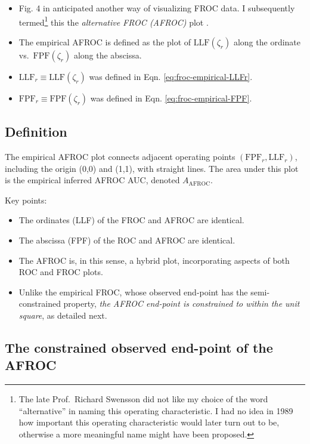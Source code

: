 \documentclass[
]{book}
\providecommand{\tightlist}{%
  \setlength{\itemsep}{0pt}\setlength{\parskip}{0pt}}
\begin{document}
\begin{itemize}
\tightlist
\item
  Fig. 4 in \citep{bunch1977free} anticipated another way of visualizing FROC data. I subsequently termed\footnote{The late Prof.~Richard Swensson did not like my choice of the word ``alternative'' in naming this operating characteristic. I had no idea in 1989 how important this operating characteristic would later turn out to be, otherwise a more meaningful name might have been proposed.} this the \emph{alternative FROC (AFROC)} plot \citep{chakraborty1989maximum}.
\item
  The empirical AFROC is defined as the plot of \(\text{LLF}(\zeta_r)\) along the ordinate vs.~\(\text{FPF}(\zeta_r)\) along the abscissa.
\item
  \(\text{LLF}_r \equiv \text{LLF}(\zeta_r)\) was defined in Eqn. \eqref{eq:froc-empirical-LLFr}.
\item
  \(\text{FPF}_r \equiv \text{FPF}(\zeta_r)\) was defined in Eqn. \eqref{eq:froc-empirical-FPF}.
\end{itemize}

\hypertarget{froc-empirical-definition-auc-AFROC}{%
\subsection{Definition}\label{froc-empirical-definition-auc-AFROC}}

The empirical AFROC plot connects adjacent operating points \(\left( \text{FPF}_r, \text{LLF}_r \right )\), including the origin (0,0) and (1,1), with straight lines. The area under this plot is the empirical inferred AFROC AUC, denoted \(A_{\text{AFROC}}\).

Key points:

\begin{itemize}
\tightlist
\item
  The ordinates (LLF) of the FROC and AFROC are identical.
\item
  The abscissa (FPF) of the ROC and AFROC are identical.
\item
  The AFROC is, in this sense, a hybrid plot, incorporating aspects of both ROC and FROC plots.
\item
  Unlike the empirical FROC, whose observed end-point has the semi-constrained property, \emph{the AFROC end-point is constrained to within the unit square}, as detailed next.
\end{itemize}

\hypertarget{froc-empirical-AFROC-constrained}{%
\subsection{The constrained observed end-point of the AFROC}\label{froc-empirical-AFROC-constrained}}
\end{document}
